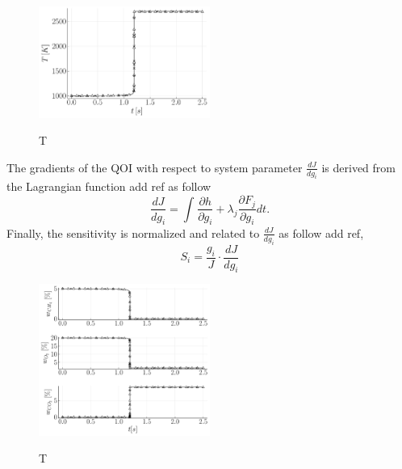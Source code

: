 \documentclass[preprint,review,12pt]{elsarticle}
\begin{document}
\begin{figure}
\centering
 {\includegraphics[width=0.5\textwidth]{figures/T validation.pdf}}
\caption{T}
    \label{fig:figure1}
 \end{figure}
The gradients of the QOI with respect to system parameter $\frac{d J}{dg_i}$ is derived from the Lagrangian function {\color{red} add ref}  as follow 
\begin{equation}
\frac{d J}{dg_i}= \int_{}^{} \frac{\partial h}{\partial g_i}+\lambda_j\frac{\partial F_j}{\partial g_i}dt.
\end{equation}
Finally, the sensitivity is normalized and related to $\frac{d J}{dg_i}$ as follow  {\color{red} add ref}, 
\begin{equation}
S_i=\frac{g_i}{J}\cdot\frac{d J}{dg_i}
\end{equation}   


\begin{figure}
\centering
 {\includegraphics[width=0.5\textwidth]{figures/all validation.pdf}}
\caption{T}
    \label{fig:figure2}
\end{figure}
\end{document}
